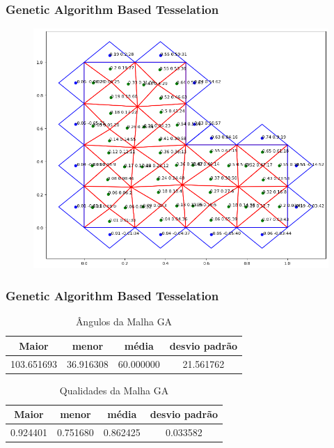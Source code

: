 \documentclass[brazil]{beamer}
\begin{document}
\begin{frame}
  \frametitle{Genetic Algorithm Based Tesselation}

  \begin{figure}
    \includegraphics[width=0.6\linewidth]{fig/malha-ga.png}
  \end{figure}

\end{frame}
\begin{frame}
  \frametitle{Genetic Algorithm Based Tesselation}
  \begin{table}[hb]
    \centering
    \par\caption{Ângulos da Malha GA}
    \begin{tabular}{c|c|c|c}
      Maior      & menor     & média     & desvio padrão \\\hline\hline
      103.651693&36.916308&60.000000&21.561762\\\hline
    \end{tabular}
    \label{tab:angulos-malha-ga}
  \end{table}

  \begin{table}[hb]
    \centering
    \par\caption{Qualidades da Malha GA}
    \begin{tabular}{c|c|c|c}
      Maior    & menor    & média    & desvio padrão \\\hline\hline
      0.924401&0.751680&0.862425&0.033582\\\hline
    \end{tabular}
    \label{tab:qualidades-malha-ga}
  \end{table}
\end{frame}
\end{document}
